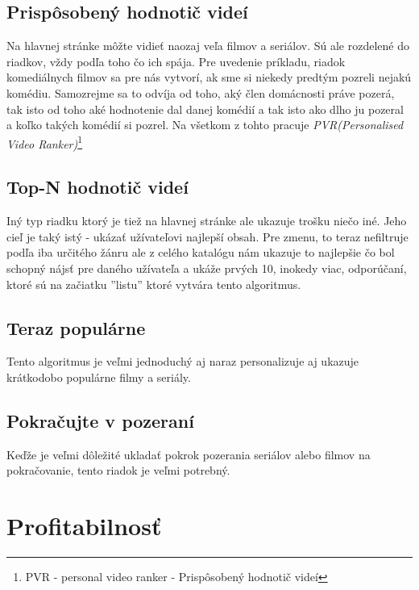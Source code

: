 \documentclass[10pt,twoside,slovak,a4paper]{article}
\begin{document}
\subsection{Prispôsobený hodnotič videí}
Na hlavnej stránke môžte vidieť naozaj veľa filmov a seriálov. Sú ale rozdelené do riadkov, vždy podľa toho čo ich spája. Pre uvedenie príkladu, riadok komediálnych filmov sa pre nás vytvorí, ak sme si niekedy predtým pozreli nejakú komédiu. Samozrejme sa to odvíja od toho, aký člen domácnosti práve pozerá, tak isto od toho aké hodnotenie dal danej komédií a tak isto ako dlho ju pozeral a koľko takých komédií si pozrel. Na všetkom z tohto pracuje \textit{PVR(Personalised Video Ranker)}\footnote{PVR - personal video ranker - Prispôsobený hodnotič videí\cite{10.1145/2843948}}\cite{10.1145/2843948}
\subsection{Top-N hodnotič videí}
Iný typ riadku ktorý je tiež na hlavnej stránke ale ukazuje trošku niečo iné. Jeho cieľ je taký istý - ukázať užívateľovi najlepší obsah. Pre zmenu, to teraz nefiltruje podľa iba určitého žánru ale z celého katalógu nám ukazuje to najlepšie čo bol schopný nájsť pre daného užívateľa a ukáže prvých 10, inokedy viac, odporúčaní, ktoré sú na začiatku ''listu'' ktoré vytvára tento algoritmus.\cite{amatriain2015recommender}
\subsection{Teraz populárne}
Tento algoritmus je veľmi jednoduchý aj naraz personalizuje aj ukazuje krátkodobo populárne filmy a seriály.
\subsection{Pokračujte v pozeraní}
Keďže je veľmi dôležité ukladať pokrok pozerania seriálov alebo filmov na pokračovanie, tento riadok je veľmi potrebný.


\section{Profitabilnosť} \label{Profit}
\end{document}
